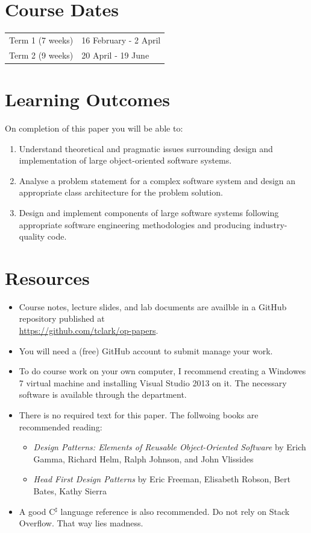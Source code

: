 \documentclass{article}
\newcommand{\Csh}{C$^\sharp$}
\begin{document}
\section*{Course Dates}
\begin{tabular}{ll}
Term 1 (7 weeks) & 16 February - 2 April\\
Term 2 (9 weeks) & 20 April - 19 June\\
\end{tabular}

\newpage 

\section*{Learning Outcomes}
On completion of this paper you will be able to:
\begin{enumerate}
    \item Understand theoretical and pragmatic issues surrounding design and implementation of large object-oriented software systems.
    \item Analyse a problem statement for a complex software system and design an appropriate class architecture for the problem solution.
    \item Design and implement components of large software systems following appropriate software engineering methodologies and producing industry-quality code.
\end{enumerate}

\section*{Resources}
\begin{itemize}
	\item Course notes, lecture slides, and lab documents are availble in a GitHub repository published at \\ \url{https://github.com/tclark/op-papers}.
	\item You will need a (free) GitHub account to submit manage your work.
	\item To do course work on your own computer, I recommend creating a Windowes 7 virtual machine and installing Visual Studio 2013 on it.  The necessary software is available through the department.
	\item There is no required text for this paper.  The follwoing books are recommended reading:
		\begin{itemize}
			\item \emph{Design Patterns: Elements of Reusable Object-Oriented Software} by Erich Gamma, Richard Helm, Ralph Johnson, and John Vlissides
			\item \emph{Head First Design Patterns} by Eric Freeman, Elisabeth Robson, Bert Bates, Kathy Sierra
		\end{itemize}
	\item A good \Csh{} language reference is also recommended. Do not rely on Stack Overflow.  That way lies madness.
\end{itemize}
\end{document}

